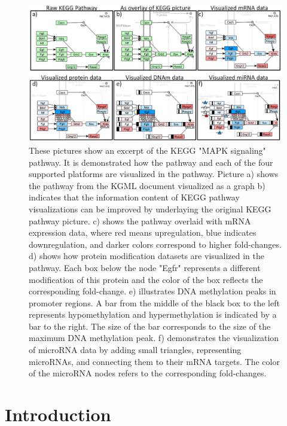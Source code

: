 \documentclass{bioinfo}
\begin{document}
\begin{figure}[t]
\centering
\includegraphics[width=1.0\textwidth]{figures/visualization-steps.png}
\caption{These pictures show an excerpt of the KEGG "MAPK signaling" pathway. It is demonstrated how the
pathway and each of the four supported platforms are visualized in the pathway. Picture a) shows the
pathway from the KGML document visualized as a graph b) indicates that the information content of KEGG
pathway visualizations can be improved by underlaying the original KEGG pathway picture. c) shows the
pathway overlaid with mRNA expression data, where red means upregulation, blue indicates downregulation, and
darker colors correspond to higher fold-changes. d) shows how protein modification datasets are
visualized in the pathway. Each box below the node "Egfr" represents a different modification of this
protein and the color of the box reflects the corresponding fold-change. e) illustrates DNA
methylation peaks in promoter regions. A bar from the middle of the black box to the left represents
hypomethylation and hypermethylation is indicated by a bar to the right. The size of the bar
corresponds to the size of the maximum DNA methylation peak. f) demonstrates the visualization of
microRNA data by adding small triangles, representing microRNAs, and connecting them to their mRNA targets.
The color of the microRNA nodes refers to the corresponding fold-changes.}
\label{fig:visualization_steps}
\end{figure}


\section{Introduction}
\end{document}
